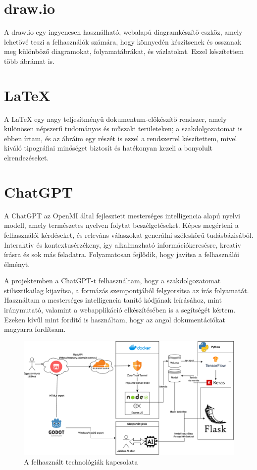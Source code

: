 \section{draw.io}
A draw.io \cite{Aboutdra31:online} egy ingyenesen használható, webalapú diagramkészítő eszköz, amely lehetővé teszi a felhasználók számára, hogy könnyedén készítsenek és osszanak meg különböző diagramokat, folyamatábrákat, és vázlatokat. Ezzel készítettem több ábrámat is. 

\section{LaTeX}
A LaTeX egy nagy teljesítményű dokumentum-előkészítő rendszer, amely különösen népszerű tudományos és műszaki területeken; a szakdolgozatomat is ebben írtam, és az ábráim egy részét is ezzel a rendszerrel készítettem, mivel kiváló tipográfiai minőséget biztosít és hatékonyan kezeli a bonyolult elrendezéseket.

\section{ChatGPT}
A ChatGPT \cite{Introduc55:online} az OpenMI által fejlesztett mesterséges intelligencia alapú nyelvi modell, amely természetes nyelven folytat beszélgetéseket. Képes megérteni a felhasználói kérdéseket, és releváns válaszokat generálni széleskörű tudásbázisából. Interaktív és kontextusérzékeny, így alkalmazható információkeresésre, kreatív írásra és sok más feladatra. Folyamatosan fejlődik, hogy javítsa a felhasználói élményt.

A projektemben a ChatGPT-t felhasználtam, hogy a szakdolgozatomat stilisztikailag kijavítsa, a formázás szempontjából felgyorsítsa az írás folyamatát. Használtam a mesterséges intelligencia tanító kódjának leírásához, mint iránymutató, valamint a webapplikáció elkészítésében is a segítségét kértem. Ezeken kívűl mint fordító is használtam, hogy az angol dokumentációkat magyarra fordítsam. 
\begin{figure}[h]
    \center
    \includegraphics[width=\textwidth]{img/fullfolyamat.png}
    \caption{A felhasznált technológiák kapcsolata}
    \label{img:technology}
\end{figure}